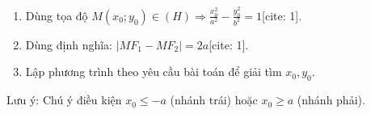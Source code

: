 \begin{enumerate}
\item Dùng tọa độ $M(x_0; y_0) \in (H) \Rightarrow \frac{x_0^2}{a^2} - \frac{y_0^2}{b^2} = 1$[cite: 1].
\item Dùng định nghĩa: $|MF_1 - MF_2| = 2a$[cite: 1].
\item Lập phương trình theo yêu cầu bài toán để giải tìm $x_0, y_0$.
\end{enumerate}
Lưu ý: Chú ý điều kiện $x_0 \le -a$ (nhánh trái) hoặc $x_0 \ge a$ (nhánh phải).
